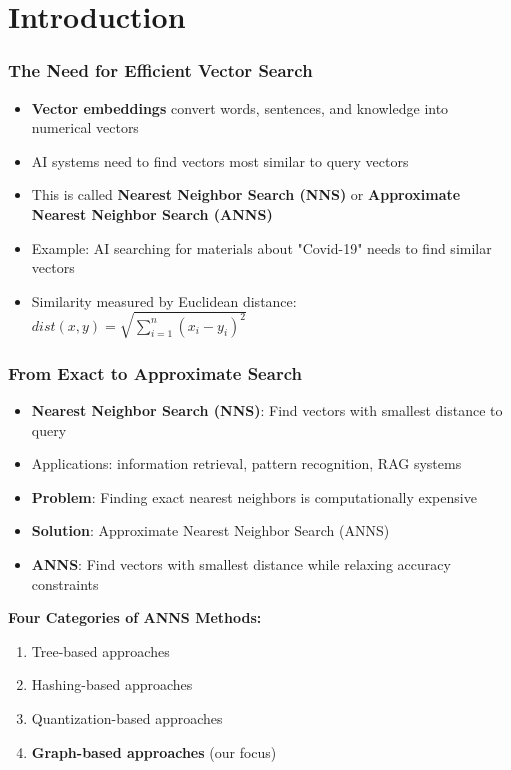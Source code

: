 \section{Introduction}%
\begin{frame}
\frametitle{The Need for Efficient Vector Search}

\begin{itemize}
    \item \textbf{Vector embeddings} convert words, sentences, and knowledge into numerical vectors
    \item AI systems need to find vectors most similar to query vectors
    \item This is called \textbf{Nearest Neighbor Search (NNS)} or \textbf{Approximate Nearest Neighbor Search (ANNS)}
    \item Example: AI searching for materials about "Covid-19" needs to find similar vectors
    \item Similarity measured by Euclidean distance: $dist(x, y) = \sqrt{\sum_{i=1}^{n}(x_i - y_i)^2}$
\end{itemize}
\end{frame}%
\begin{frame}
\frametitle{From Exact to Approximate Search}

\begin{itemize}
    \item \textbf{Nearest Neighbor Search (NNS)}: Find vectors with smallest distance to query
    \item Applications: information retrieval, pattern recognition, RAG systems
    \item \textbf{Problem}: Finding exact nearest neighbors is computationally expensive
    \item \textbf{Solution}: Approximate Nearest Neighbor Search (ANNS)
    \item \textbf{ANNS}: Find vectors with smallest distance while relaxing accuracy constraints
\end{itemize}

\vspace{0.5cm}
\textbf{Four Categories of ANNS Methods:}
\begin{enumerate}
    \item Tree-based approaches
    \item Hashing-based approaches
    \item Quantization-based approaches
    \item \textbf{Graph-based approaches} (our focus)
\end{enumerate}
\end{frame}%
